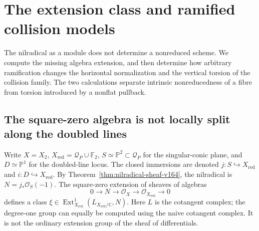\documentclass[11pt,reqno]{amsart}
\numberwithin{equation}{section}
\theoremstyle{definition}\newtheorem{definition}[theorem]{Definition}
\theoremstyle{remark}\newtheorem{remark}[theorem]{Remark}
\newcommand{\C}{\mathbb C}\newcommand{\Q}{\mathbb Q}
\newcommand{\Pj}{\mathbb P}\newcommand{\A}{\mathbb A}
\newcommand{\OO}{\mathcal O}\newcommand{\II}{\mathcal I}
\begin{document}
\section{The extension class and ramified collision models}
\label{sec:extension-ramification-v166}
The nilradical as a module does not determine a nonreduced scheme.
We compute the missing algebra extension, and then determine how
arbitrary ramification changes the horizontal normalization and the
vertical torsion of the collision family. The two calculations
separate intrinsic nonreducedness of a fibre from torsion introduced
by a nonflat pullback.

\subsection{The square-zero algebra is not locally split along the doubled lines}
Write $X=X_2$, $X_{\mathrm{red}}=\mathcal Q_P\cup\mathbb F_2$,
$S\simeq\Pj^2\subset\mathcal Q_P$ for the singular-conic plane,
and $D\simeq\Pj^1$ for the doubled-line locus. The closed immersions
are denoted $j:S\hookrightarrow X_{\mathrm{red}}$ and
$i:D\hookrightarrow X_{\mathrm{red}}$. By
Theorem~\ref{thm:nilradical-sheaf-v164}, the nilradical is
$N=j_*\OO_S(-1)$. The square-zero extension of sheaves of algebras
\begin{equation}\label{eq:extension-v166}
 0\longrightarrow N\longrightarrow\OO_X
   \longrightarrow\OO_{X_{\mathrm{red}}}\longrightarrow0
\end{equation}
defines a class
$\xi\in\operatorname{Ext}^1_{X_{\mathrm{red}}}
(L_{X_{\mathrm{red}}/\C},N)$.
Here $L$ is the cotangent complex; the degree-one group can equally
be computed using the naive cotangent complex. It is not the
ordinary extension group of the sheaf of differentials.
\end{document}
